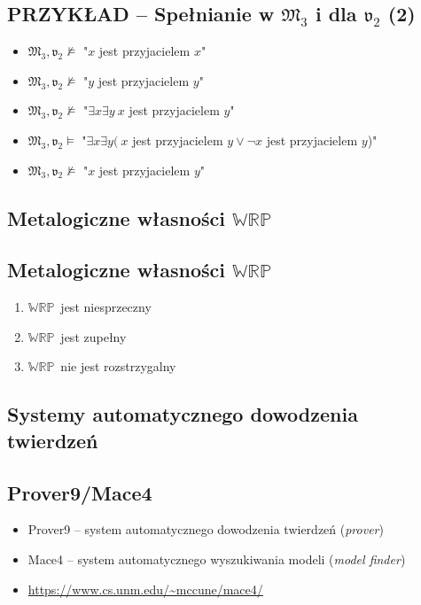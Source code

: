 \documentclass[12pt]{article}
\newcommand {\WRP} {\ensuremath{\mathbb{WRP}}}
\begin{document}
\subsection{PRZYKŁAD -- Spełnianie w $\mathfrak{M}_3$ i dla $\mathfrak{v}_2$ (2)}
%
\begin{itemize}
\item $\mathfrak{M}_3,\mathfrak{v}_2 \not \vDash$ "$x$ jest przyjacielem $x$"%
\item $\mathfrak{M}_3,\mathfrak{v}_2 \not \vDash$ "$y$ jest przyjacielem $y$"%
\item $\mathfrak{M}_3,\mathfrak{v}_2 \not \vDash$ "$\exists x \exists y ~x$ jest przyjacielem $y$"%
\item $\mathfrak{M}_3,\mathfrak{v}_2 \vDash$ "$\exists x \exists y ( ~x$ jest przyjacielem $y \lor \neg x$ jest przyjacielem $y$)"%
\item $\mathfrak{M}_3,\mathfrak{v}_2 \not \vDash$ "$x$ jest przyjacielem $y$"
\end{itemize}
%


\subsection{Metalogiczne własności \WRP}

\subsection{Metalogiczne własności \WRP}
    \begin{enumerate}
        \item \WRP\ jest niesprzeczny
        \item \WRP\ jest zupełny
        \item \WRP\ nie jest rozstrzygalny
    \end{enumerate}
%

\subsection{Systemy automatycznego dowodzenia twierdzeń}

\subsection{Prover9/Mace4}%
    \begin{itemize}
        \item Prover9 -- system automatycznego dowodzenia twierdzeń (\emph{prover})
        \item Mace4 -- system automatycznego wyszukiwania modeli (\emph{model finder})%
				\item \url{https://www.cs.unm.edu/~mccune/mace4/}
    \end{itemize}
%
\end{document}
